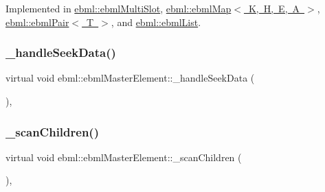Implemented in \mbox{\hyperlink{classebml_1_1ebmlMultiSlot_a8374290bfe21447729ed0331eb845905}{ebml\+::ebml\+Multi\+Slot}}, \mbox{\hyperlink{classebml_1_1ebmlMap_a8b6a25187190a26a7988d4bbaf853d78}{ebml\+::ebml\+Map$<$ K, H, E, A $>$}}, \mbox{\hyperlink{classebml_1_1ebmlPair_aa9885eed27f8a81efe246b5a6755186b}{ebml\+::ebml\+Pair$<$ T $>$}}, and \mbox{\hyperlink{classebml_1_1ebmlList_aec7a5554e1d10fd7575104471cb2c6f4}{ebml\+::ebml\+List}}.

\mbox{\label{classebml_1_1ebmlMasterElement_a70a38217f7aab170e2e2f062d3c9a777}} 
\subsubsection{\texorpdfstring{\+\_\+handle\+Seek\+Data()}{\_handleSeekData()}}
{\footnotesize\ttfamily virtual void ebml\+::ebml\+Master\+Element\+::\+\_\+handle\+Seek\+Data (\begin{DoxyParamCaption}\item[{const \mbox{\hyperlink{classebml_1_1parseFile}{parse\+File}} \&}]{ }\end{DoxyParamCaption})\hspace{0.3cm}{\ttfamily [protected]}, {\ttfamily [virtual]}}

\mbox{\label{classebml_1_1ebmlMasterElement_a233be2f503f44d36608b16db5a2c3394}} 
\subsubsection{\texorpdfstring{\+\_\+scan\+Children()}{\_scanChildren()}}
{\footnotesize\ttfamily virtual void ebml\+::ebml\+Master\+Element\+::\+\_\+scan\+Children (\begin{DoxyParamCaption}\item[{\mbox{\hyperlink{classebml_1_1parseFile_1_1iterator}{parse\+File\+::iterator}} \&}]{ }\end{DoxyParamCaption})\hspace{0.3cm}{\ttfamily [protected]}, {\ttfamily [virtual]}}

